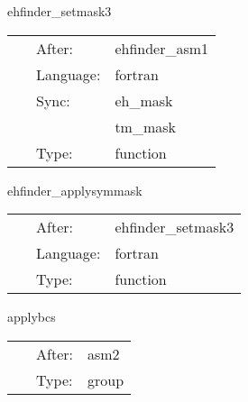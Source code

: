 
\hspace{5mm} ehfinder\_setmask3 

\hspace{5mm}{\it check to see if the mask needs to be modified } 


\hspace{5mm}

 \begin{tabular*}{160mm}{cll} 
~ & After:  & ehfinder\_asm1 \\ 
~ & Language:  & fortran \\ 
~ & Sync:  & eh\_mask \\ 
~& ~ &tm\_mask\\ 
~ & Type:  & function \\ 
\end{tabular*} 


\vspace{5mm}


\hspace{5mm} ehfinder\_applysymmask 

\hspace{5mm}{\it select eh\_mask for boundary conditions } 


\hspace{5mm}

 \begin{tabular*}{160mm}{cll} 
~ & After:  & ehfinder\_setmask3 \\ 
~ & Language:  & fortran \\ 
~ & Type:  & function \\ 
\end{tabular*} 


\vspace{5mm}


\hspace{5mm} applybcs 

\hspace{5mm}{\it apply boundary conditions (symmetries) } 


\hspace{5mm}

 \begin{tabular*}{160mm}{cll} 
~ & After:  & asm2 \\ 
~ & Type:  & group \\ 
\end{tabular*} 


